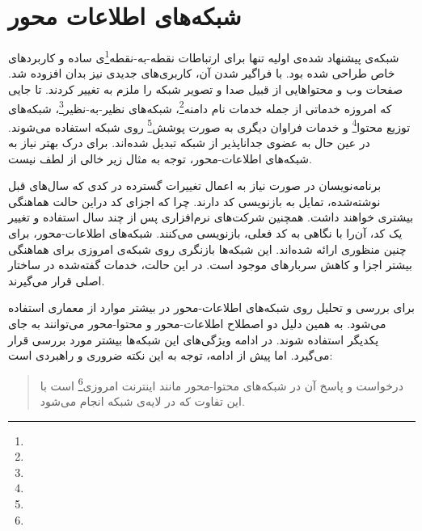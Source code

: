 
\chapter{شبکه‌های اطلاعات محور}
شبکه‌ی پیشنهاد شده‌ی اولیه تنها برای ارتباطات نقطه-به-نقطه\footnote{}ی ساده و کاربردهای خاص طراحی شده بود. با فراگیر شدن آن، کاربری‌های جدیدی نیز بدان افزوده شد. صفحات وب و محتواهایی از قبیل صدا و تصویر شبکه را ملزم به تغییر کردند. تا جایی که امروزه خدماتی از جمله خدمات نام دامنه\footnote{}، شبکه‌های نظیر-به-نظیر\footnote{}، شبکه‌های توزیع محتوا\footnote{} و خدمات فراوان دیگری به صورت پوشش\footnote{} روی شبکه استفاده می‌شوند. در عین حال به عضوی جداناپذیر از شبکه تبدیل شده‌اند. برای درک بهتر نیاز به شبکه‌های اطلاعات-محور، توجه به مثال زیر خالی از لطف نیست.

برنامه‌نویسان در صورت نیاز به اعمال تغییرات گسترده در کدی که سال‌های قبل نوشته‌شده، تمایل به بازنویسی کد دارند. چرا که اجزای کد  دراین حالت هماهنگی بیشتری خواهند داشت. همچنین شرکت‌های نرم‌افزاری پس از چند سال استفاده و تغییر یک کد، آن‌را با نگاهی به کد فعلی، بازنویسی می‌کنند. شبکه‌های اطلاعات-محور، برای چنین منظوری ارائه شده‌اند. این شبکه‌ها بازنگری روی شبکه‌ی امروزی برای هماهنگی بیشتر اجزا و کاهش سربارهای موجود است. در این حالت، خدمات گفته‌شده در ساختار اصلی قرار می‌گیرند.

%	
%	
%	
%	
%	

برای بررسی و تحلیل روی شبکه‌های اطلاعات-محور در بیشتر موارد از معماری  استفاده می‌شود. به همین دلیل دو اصطلاح اطلاعات-محور و محتوا-محور می‌توانند به جای یکدیگر استفاده شوند. در ادامه ویژگی‌های این شبکه‌ها بیشتر مورد بررسی قرار می‌گیرد. اما پیش از ادامه‌، توجه به این نکته ضروری و راهبردی است:
\begin{quote}
	درخواست و پاسخ آن در شبکه‌های محتوا-محور مانند اینترنت امروزی\footnote{} است با این تفاوت که در لایه‌ی شبکه انجام می‌شود.
\end{quote}

